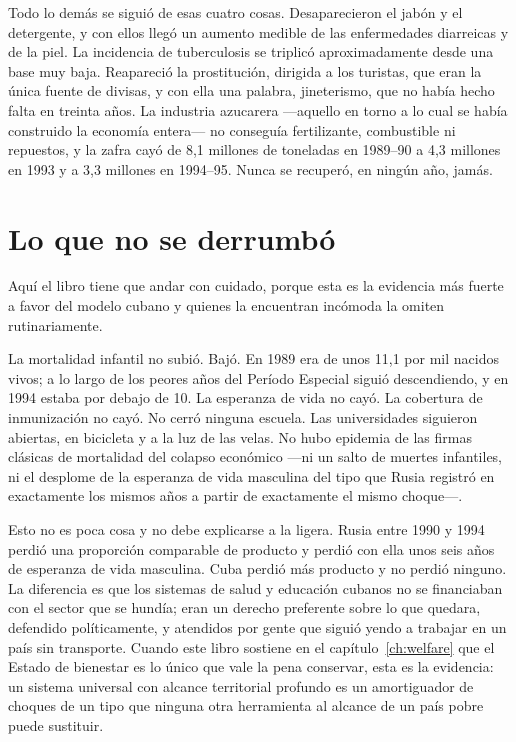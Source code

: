 Todo lo demás se siguió de esas cuatro cosas. Desaparecieron el jabón y el
detergente, y con ellos llegó un aumento medible de las enfermedades diarreicas y
de la piel. La incidencia de tuberculosis se triplicó aproximadamente desde una
base muy baja. Reapareció la prostitución, dirigida a los turistas, que eran la
única fuente de divisas, y con ella una palabra, jineterismo, que no había hecho
falta en treinta años. La industria azucarera ---aquello en torno a lo cual se
había construido la economía entera--- no conseguía fertilizante, combustible ni
repuestos, y la zafra cayó de 8,1 millones de toneladas en 1989--90 a 4,3 millones
en 1993 y a 3,3 millones en 1994--95. Nunca se recuperó, en ningún año, jamás.

\section{Lo que no se derrumbó}

Aquí el libro tiene que andar con cuidado, porque esta es la evidencia más fuerte
a favor del modelo cubano y quienes la encuentran incómoda la omiten
rutinariamente.

La mortalidad infantil no subió. Bajó. En 1989 era de unos 11,1 por mil nacidos
vivos; a lo largo de los peores años del Período Especial siguió descendiendo, y
en 1994 estaba por debajo de 10.\unv{} La esperanza de vida no cayó. La cobertura
de inmunización no cayó. No cerró ninguna escuela. Las universidades siguieron
abiertas, en bicicleta y a la luz de las velas. No hubo epidemia de las firmas
clásicas de mortalidad del colapso económico ---ni un salto de muertes infantiles,
ni el desplome de la esperanza de vida masculina del tipo que Rusia registró en
exactamente los mismos años a partir de exactamente el mismo choque---.

Esto no es poca cosa y no debe explicarse a la ligera. Rusia entre 1990 y 1994
perdió una proporción comparable de producto y perdió con ella unos seis años de
esperanza de vida masculina. Cuba perdió más producto y no perdió ninguno. La
diferencia es que los sistemas de salud y educación cubanos no se financiaban con
el sector que se hundía; eran un derecho preferente sobre lo que quedara,
defendido políticamente, y atendidos por gente que siguió yendo a trabajar en un
país sin transporte. Cuando este libro sostiene en el capítulo~\ref{ch:welfare}
que el Estado de bienestar es lo único que vale la pena conservar, esta es la
evidencia: un sistema universal con alcance territorial profundo es un
amortiguador de choques de un tipo que ninguna otra herramienta al alcance de un
país pobre puede sustituir.

